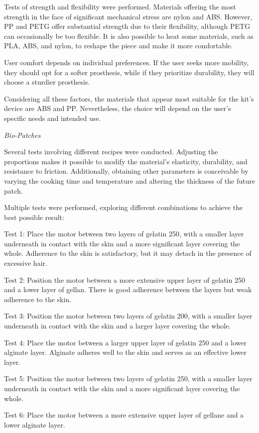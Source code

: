 Tests of strength and flexibility were performed. Materials offering the most strength in the face of significant mechanical stress are nylon and ABS. However, PP and PETG offer substantial strength due to their flexibility, although PETG can occasionally be too flexible. It is also possible to heat some materials, such as PLA, ABS, and nylon, to reshape the piece and make it more comfortable.

User comfort depends on individual preferences. If the user seeks more mobility, they should opt for a softer prosthesis, while if they prioritize durability, they will choose a sturdier prosthesis.

Considering all these factors, the materials that appear most suitable for the kit's device are ABS and PP. Nevertheless, the choice will depend on the user’s specific needs and intended use. 

\textit{Bio-Patches}

Several tests involving different recipes were conducted. Adjusting the proportions makes it possible to modify the material's elasticity, durability, and resistance to friction. Additionally, obtaining other parameters is conceivable by varying the cooking time and temperature and altering the thickness of the future patch.

Multiple tests were performed, exploring different combinations to achieve the best possible result:

\item Test 1: Place the motor between two layers of gelatin 250, with a smaller layer underneath in contact with the skin and a more significant layer covering the whole. Adherence to the skin is satisfactory, but it may detach in the presence of excessive hair.
\item Test 2: Position the motor between a more extensive upper layer of gelatin 250 and a lower layer of gellan. There is good adherence between the layers but weak adherence to the skin.
\item Test 3: Position the motor between two layers of gelatin 200, with a smaller layer underneath in contact with the skin and a larger layer covering the whole.
\item Test 4: Place the motor between a larger upper layer of gelatin 250 and a lower alginate layer. Alginate adheres well to the skin and serves as an effective lower layer.
\item Test 5: Position the motor between two layers of gelatin 250, with a smaller layer underneath in contact with the skin and a more significant layer covering the whole.
\item Test 6: Place the motor between a more extensive upper layer of gellane and a lower alginate layer.

